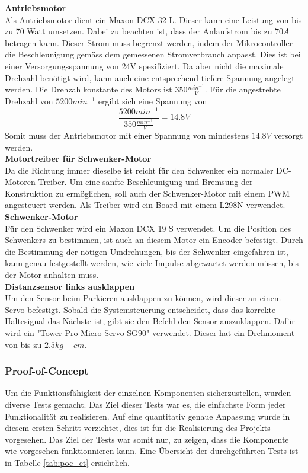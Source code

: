 \documentclass[../../main.tex]{subfiles}
\begin{document}
    \textbf{Antriebsmotor}\\
    Als Antriebsmotor dient ein Maxon DCX 32 L. Dieser kann eine Leistung von bis zu 70 Watt umsetzen. Dabei zu beachten ist, dass der Anlaufstrom bis zu $70A$ betragen kann. Dieser Strom muss begrenzt werden, indem der Mikrocontroller die Beschleunigung gemäss dem gemessenen Stromverbrauch anpasst. \cite{MaxonDCX32L} Dies ist bei einer Versorgungsspannung von 24V spezifiziert. Da aber nicht die maximale Drehzahl benötigt wird, kann auch eine entsprechend tiefere Spannung angelegt werden. Die Drehzahlkonstante des Motors ist $350 \frac{min^{-1}}{V}$. Für die angestrebte Drehzahl von $5200min^{-1}$ ergibt sich eine Spannung von $$\frac{5200min^{-1}}{350 \frac{min^{-1}}{V}} =14.8V$$ Somit muss der Antriebsmotor mit einer Spannung von mindestens $14.8V$ versorgt werden.\\

    \textbf{Motortreiber für Schwenker-Motor}\\
    Da die Richtung immer dieselbe ist reicht für den Schwenker ein normaler DC-Motoren Treiber. Um eine sanfte Beschleunigung und Bremsung der Konstruktion zu ermöglichen, soll auch der Schwenker-Motor mit einem PWM angesteuert werden. Als Treiber wird ein Board mit einem L298N verwendet.\\

    \textbf{Schwenker-Motor}\\
    Für den Schwenker wird ein Maxon DCX 19 S verwendet. Um die Position des Schwenkers zu bestimmen, ist auch an diesem Motor ein Encoder befestigt. Durch die Bestimmung der nötigen Umdrehungen, bis der Schwenker eingefahren ist, kann genau festgestellt werden, wie viele Impulse abgewartet werden müssen, bis der Motor anhalten muss. \cite{MaxonDCX19S}\\

    \textbf{Distanzsensor links ausklappen}\\
    Um den Sensor beim Parkieren ausklappen zu können, wird dieser an einem Servo befestigt. Sobald die Systemsteuerung entscheidet, dass das korrekte Haltesignal das Nächste ist, gibt sie den Befehl den Sensor auszuklappen. Dafür wird ein "Tower Pro Micro Servo SG90" verwendet. Dieser hat ein Drehmoment von bis zu $2.5 kg-cm$. \cite{SG90Datasheet}\\

    \subsubsection{Proof-of-Concept}
    Um die Funktionsfähigkeit der einzelnen Komponenten sicherzustellen, wurden diverse Tests gemacht. Das Ziel dieser Tests war es, die einfachste Form jeder Funktionalität zu realisieren. Auf eine quantitativ genaue Anpassung wurde in diesem ersten Schritt verzichtet, dies ist für die Realisierung des Projekts vorgesehen. Das Ziel der Tests war somit nur, zu zeigen, dass die Komponente wie vorgesehen funktionnieren kann. Eine Übersicht der durchgeführten Tests ist in Tabelle \ref{tab:poc_et} ersichtlich.\\
\end{document}
